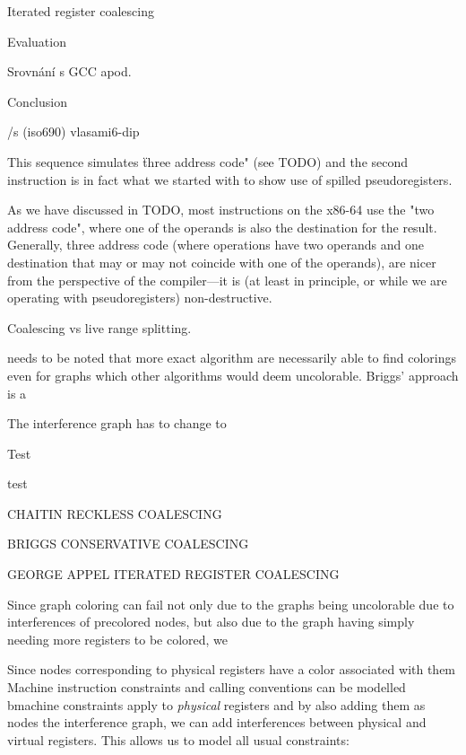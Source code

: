 Iterated register coalescing

\chap Evaluation

Srovnání s GCC apod.

\chap Conclusion

\bibchap
\usebib/s (iso690) vlasami6-dip

\bye

This sequence simulates \"three address code" (see TODO) and the second instruction
is in fact what we started with to show use of spilled pseudoregisters.


As we have discussed in TODO, most instructions on
the x86-64 use the "two address code", where one of the operands is also the
destination for the result. Generally, three address code (where operations have
two operands and one destination that may or may not coincide with one of the
operands), are nicer from the perspective of the compiler---it is (at least in
principle, or while we are operating with pseudoregisters) non-destructive.





Coalescing vs live range splitting.



%

needs to be noted that
more exact algorithm are necessarily able to find colorings even for graphs
which other algorithms would deem uncolorable. Briggs' approach is a 

The
interference graph has to change to 

\seccc Test

test




CHAITIN RECKLESS COALESCING

BRIGGS CONSERVATIVE COALESCING

GEORGE APPEL ITERATED REGISTER COALESCING



Since graph coloring can fail not only due to the graphs being uncolorable due
to interferences of precolored nodes, but also due to the graph having simply
needing more registers to be colored, we 

Since nodes corresponding to physical registers have a color associated with
them
Machine instruction constraints and calling conventions can be modelled bmachine constraints apply to {\em physical}
registers and by also adding them as nodes the interference graph, we can add
interferences between physical and virtual registers. This allows us to model
all usual constraints:

